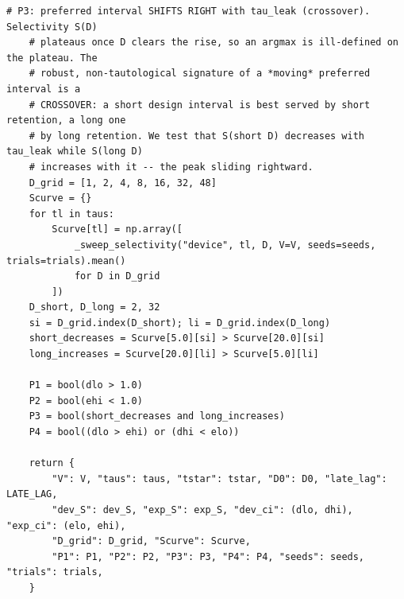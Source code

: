 \begin{lstlisting}[caption={mrl\_trace/selectivity.py},label={lst:siox-src-selectivity}]
    # P3: preferred interval SHIFTS RIGHT with tau_leak (crossover). Selectivity S(D)
    # plateaus once D clears the rise, so an argmax is ill-defined on the plateau. The
    # robust, non-tautological signature of a *moving* preferred interval is a
    # CROSSOVER: a short design interval is best served by short retention, a long one
    # by long retention. We test that S(short D) decreases with tau_leak while S(long D)
    # increases with it -- the peak sliding rightward.
    D_grid = [1, 2, 4, 8, 16, 32, 48]
    Scurve = {}
    for tl in taus:
        Scurve[tl] = np.array([
            _sweep_selectivity("device", tl, D, V=V, seeds=seeds, trials=trials).mean()
            for D in D_grid
        ])
    D_short, D_long = 2, 32
    si = D_grid.index(D_short); li = D_grid.index(D_long)
    short_decreases = Scurve[5.0][si] > Scurve[20.0][si]
    long_increases = Scurve[20.0][li] > Scurve[5.0][li]

    P1 = bool(dlo > 1.0)
    P2 = bool(ehi < 1.0)
    P3 = bool(short_decreases and long_increases)
    P4 = bool((dlo > ehi) or (dhi < elo))

    return {
        "V": V, "taus": taus, "tstar": tstar, "D0": D0, "late_lag": LATE_LAG,
        "dev_S": dev_S, "exp_S": exp_S, "dev_ci": (dlo, dhi), "exp_ci": (elo, ehi),
        "D_grid": D_grid, "Scurve": Scurve,
        "P1": P1, "P2": P2, "P3": P3, "P4": P4, "seeds": seeds, "trials": trials,
    }



\end{lstlisting}
